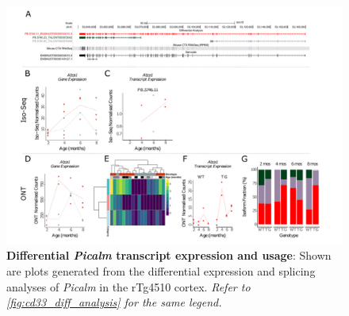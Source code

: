 \begin{landscape}
	\begin{figure}[htp]
		\begin{center}
			\includegraphics[page=12,trim={0 0.5cm 0 1.5cm},scale =0.85]{Figures/TargetGene_DifferentialAnalysis.pdf}
		\end{center}
		\captionsetup{width=1.5\textwidth}
		\caption[Differential \textit{Picalm} transcript expression and usage]%
		{\textbf{Differential \textit{Picalm} transcript expression and usage}: Shown are plots generated from the differential expression and splicing analyses of \textit{Picalm} in the rTg4510 cortex. \textit{Refer to \cref{fig:cd33_diff_analysis} for the same legend.}}   
		\label{fig:Picalm_diff_analysis}
	\end{figure}
\end{landscape}

